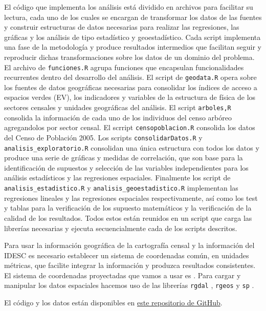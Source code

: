 \documentclass[12pt,]{book}
\begin{document}
El código que implementa los análisis está dividido en archivos para
facilitar su lectura, cada uno de los cuales se encargan de transformar
los datos de las fuentes y construir estructuras de datos necesarias
para realizar las regresiones, las gráficas y los análisis de tipo
estadístico y geoestadístico. Cada script implementa una fase de la
metodología y produce resultados intermedios que facilitan seguir y
reproducir dichas transformaciones sobre los datos de un dominio del
problema. El archivo de \texttt{funciones.R} agrupa funciones que
encapsulan funcionalidades recurrentes dentro del desarrollo del
análisis. El script de \texttt{geodata.R} opera sobre los fuentes de
datos geográficas necesarias para consolidar los índices de acceso a
espacios verdes (EV), los indicadores y variables de la estructura de
física de los sectores censales y unidades geográficas del análisis. El
script \texttt{arboles,R} consolida la información de cada uno de los
individuos del censo arbóreo agregandolos por sector censal. El scrript
\texttt{censopoblacion.R} consolida los datos del Censo de Población
2005. Los scripts \texttt{consolidarDatos.R} y
\texttt{analisis\_exploratorio.R} consolidan una única estructura con
todos los datos y produce una serie de gráficas y medidas de
correlación, que son base para la identificación de supuestos y
selección de las variables independientes para los análisis estadísticos
y las regresiones espaciales. Finalmente los script de
\texttt{analisis\_estadistico.R} y \texttt{analisis\_geoestadistico.R}
implementan las regresiones lineales y las regresiones espaciales
respectivamente, así como los test y tablas para la verificación de los
supuesto matemáticos y la verificación de la calidad de los resultados.
Todos estos están reunidos en un script que carga las librerías
necesarias y ejecuta secuencialmente cada de los scripts descritos.

Para usar la información geográfica de la cartografía censal y la
información del IDESC es necesario establecer un sistema de coordenadas
común, en unidades métricas, que facilite integrar la información y
produzca resultados consistentes. El sistema de coordenadas proyectadas
que vamos a usar es \citet{noauthor_magna-sirgas-cali_nodate}. Para
cargar y manipular los datos espaciales hacemos uso de las librerías
\texttt{rgdal} \citep{R-rgdal}, \texttt{rgeos} \citep{R-rgeos} y
\texttt{sp} \citep{R-sp}.

El código y los datos están disponibles en
\href{https://github.com/correajfc/R-CP2005-CA2015}{este repositorio de
GitHub}.
\end{document}
